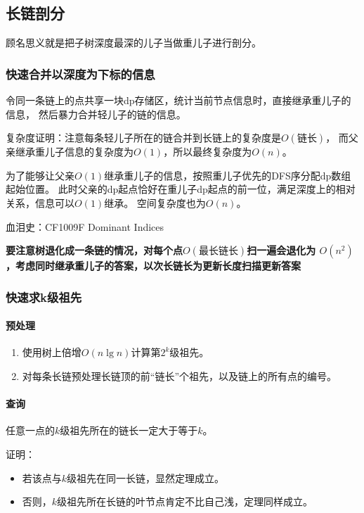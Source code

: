 \subsection{长链剖分}

顾名思义就是把子树深度最深的儿子当做重儿子进行剖分。

\subsubsection{快速合并以深度为下标的信息}
令同一条链上的点共享一块dp存储区，统计当前节点信息时，直接继承重儿子的信息，
然后暴力合并轻儿子的链的信息。

复杂度证明：注意每条轻儿子所在的链合并到长链上的复杂度是$O(\textrm{链长})$，
而父亲继承重儿子信息的复杂度为$O(1)$，所以最终复杂度为$O(n)$。

为了能够让父亲$O(1)$继承重儿子的信息，按照重儿子优先的DFS序分配dp数组起始位置。
此时父亲的dp起点恰好在重儿子dp起点的前一位，满足深度上的相对关系，信息可以$O(1)$继承。
空间复杂度也为$O(n)$。

血泪史：CF1009F Dominant Indices

{\bfseries 要注意树退化成一条链的情况，对每个点$O(\textrm{最长链长})$扫一遍会退化为
$O(n^2)$，考虑同时继承重儿子的答案，以次长链长为更新长度扫描更新答案}



\subsubsection{快速求k级祖先}
\paragraph{预处理}
\begin{enumerate}
    \item 使用树上倍增$O(n\lg n)$计算第$2^k$级祖先。
    \item 对每条长链预处理长链顶的前``链长''个祖先，以及链上的所有点的编号。
\end{enumerate}

\paragraph{查询}

\begin{theorem}\label{DBCBD}
    任意一点的$k$级祖先所在的链长一定大于等于$k$。
\end{theorem}
证明：
\begin{itemize}
    \item 若该点与$k$级祖先在同一长链，显然定理成立。
    \item 否则，$k$级祖先所在长链的叶节点肯定不比自己浅，定理同样成立。
\end{itemize}

